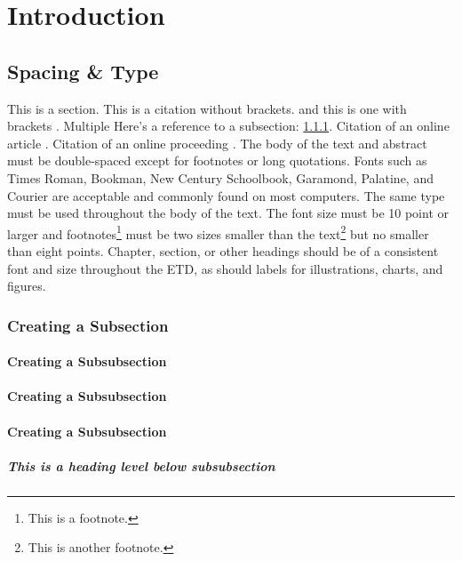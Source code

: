 \chapter{Introduction}
\label{chap:intro}
\section{Spacing \& Type}
\label{sec:section}

This is a section. This is a citation without brackets. and this is one with brackets \cite{A}. Multiple \cite{A,B,C} Here's a reference to a subsection: \ref{sec:subsection}. Citation of an online article \cite{D}. Citation of an online proceeding \cite{F}. The body of the text and abstract must be double-spaced except for footnotes or long quotations. Fonts such as Times Roman, Bookman, New Century Schoolbook, Garamond, Palatine, and Courier are acceptable and commonly found on most computers. The same type must be used throughout the body of the text. The font size must be 10 point or larger and footnotes\footnote{This is a footnote.} must be two sizes smaller than the text\footnote{This is another footnote.} but no smaller than eight points. Chapter, section, or other headings should be of a consistent font and size throughout the ETD, as should labels for illustrations, charts, and figures.

\subsection{Creating a Subsection}
\label{sec:subsection}

\subsubsection{Creating a Subsubsection}
\subsubsection{Creating a Subsubsection}
\subsubsection{Creating a Subsubsection}

\paragraph{This is a heading level below subsubsection}

